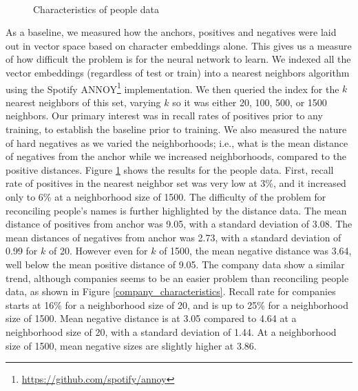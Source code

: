 \begin{figure}
    ~ 
    \label{people_distances}
    \caption{Characteristics of people data}
\label{people_characteristics}
\end{figure}

 As a baseline, we measured how the anchors, positives and negatives were laid out in vector space based on character embeddings alone.  This gives us a measure of how difficult the problem is for the neural network to learn.  We indexed all the vector embeddings (regardless of test or train) into a nearest neighbors algorithm using the Spotify ANNOY\footnote{\url{https://github.com/spotify/annoy}} implementation.  We then queried the index for the $k$ nearest neighbors of this set, varying $k$ so it was either 20, 100, 500, or 1500 neighbors.  Our primary interest was in recall rates of positives prior to any training, to establish the baseline prior to training.  We also measured the nature of hard negatives as we varied the neighborhoods; i.e., what is the mean distance of negatives from the anchor while we increased neighborhoods, compared to the positive distances.  Figure \ref{people_characteristics} shows the results for the people data.  First, recall rate of positives in the nearest neighbor set was very low at 3\%, and it increased only to 6\% at a neighborhood size of 1500.  The difficulty of the problem for reconciling people's names is further highlighted by the distance data.  The mean distance of positives from anchor was 9.05, with a standard deviation of 3.08.  The mean distances of negatives from anchor was 2.73, with a standard deviation of 0.99 for $k$ of 20.  However even for $k$ of 1500, the mean negative distance was 3.64, well below the mean positive distance of 9.05.  The company data show a similar trend, although companies seems to be an easier problem than reconciling people data, as shown in Figure \ref{company_characteristics}.  Recall rate for companies starts at 16\% for a neighborhood size of 20, and is up to 25\% for a neighborhood size of 1500.  Mean negative distance is at 3.05 compared to 4.64 at a neighborhood size of 20, with a standard deviation of 1.44.  At a neighborhood size of 1500, mean negative sizes are slightly higher at 3.86. 

